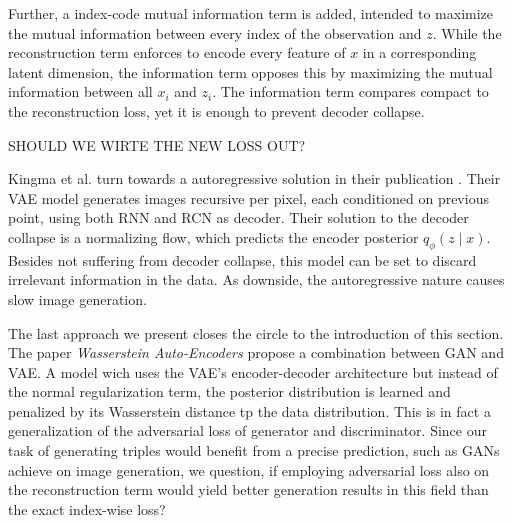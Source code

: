 Further, a index-code mutual information term is added, intended to maximize the mutual information between every index of the observation and $z$. While the reconstruction term enforces to encode every feature of $x$ in a corresponding latent dimension, the  information term opposes this by maximizing the mutual information between all  $x_i$ and $z_i$. The information term compares compact to the reconstruction loss, yet it is enough to prevent decoder collapse. 

SHOULD WE WIRTE THE NEW LOSS OUT?


Kingma et al. turn towards a autoregressive solution in their publication \cite{chen_variational_2017}. Their VAE model generates images recursive per pixel, each conditioned on previous point, using both RNN and RCN as decoder. Their solution to the decoder collapse is a normalizing flow, which predicts the encoder posterior $q_{\phi}(z \mid x)$. Besides not suffering from decoder collapse, this model can be set to discard irrelevant information in the data. As downside, the autoregressive nature causes slow image generation.


The last approach we present closes the circle to the introduction of this section. The paper \textit{Wasserstein Auto-Encoders} \cite{tolstikhin_wasserstein_2019} propose a combination between GAN and VAE. A model wich uses the VAE's encoder-decoder architecture but instead of the normal regularization term, the posterior distribution is learned and penalized by its Wasserstein distance tp the data distribution. This is in fact a generalization of the adversarial loss of generator and discriminator. Since our task of generating triples would benefit from a precise prediction, such as GANs achieve on image generation, we question, if employing adversarial loss also on the reconstruction term would yield better generation results in this field than the exact index-wise loss?







